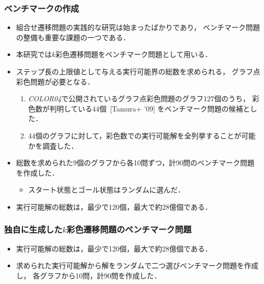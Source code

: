 \documentclass[dvipdfmx,11pt]{beamer}
\begin{document}
\begin{frame}\frametitle{ベンチマークの作成}

  \begin{itemize}
    \item 組合せ遷移問題の実践的な研究は始まったばかりであり，
          ベンチマーク問題の整備も重要な課題の一つである．
    \item 本研究では$k$彩色遷移問題をベンチマーク問題として用いる．
    \item ステップ長の上限値として与える実行可能界の総数を求められる，
          グラフ点彩色問題が必要となる．
          \begin{enumerate}
            \item \textit{COLOR04}で公開されているグラフ点彩色問題のグラフ127個のうち，
                  彩色数が判明している44個~[Tamura+ '09] をベンチマーク問題の候補とした．
            \item 44個のグラフに対して，彩色数での実行可能解を全列挙することが可能
                  かを調査した．
          \end{enumerate}
    \item 総数を求められた9個のグラフから各10問ずつ，計90問のベンチマーク問題を作成した．
          \begin{itemize}
            \item スタート状態とゴール状態はランダムに選んだ．
          \end{itemize}
    \item 実行可能解の総数は，最少で120個，最大で約28億個である．
  \end{itemize}
\end{frame}
\begin{frame}\frametitle{独自に生成した$k$彩色遷移問題のベンチマーク問題}

  \begin{table}[t]
    \centering
    
  \end{table}

  \begin{itemize}
  \item 実行可能解の総数は，最少で120個，最大で約28億個である．
  \item 求められた実行可能解から解をランダムで二つ選びベンチマーク問題を作成し，
        各グラフから10問，計90問を作成した．
  \end{itemize}

\end{frame}
\end{document}
